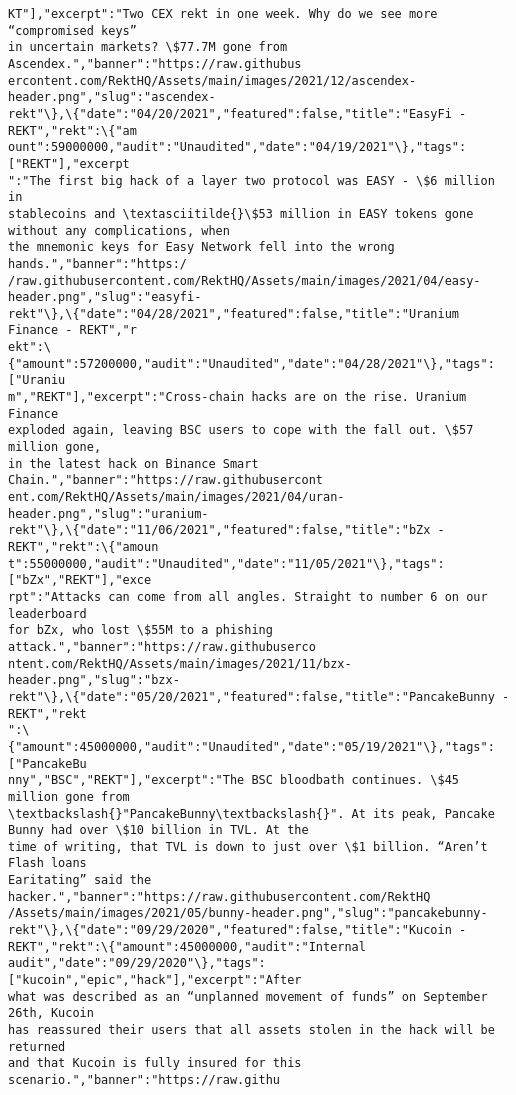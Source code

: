 \documentclass[11pt]{article}
\begin{document}
\begin{Verbatim}[commandchars=\\\{\}]
KT"],"excerpt":"Two CEX rekt in one week. Why do we see more “compromised keys”
in uncertain markets? \$77.7M gone from Ascendex.","banner":"https://raw.githubus
ercontent.com/RektHQ/Assets/main/images/2021/12/ascendex-
header.png","slug":"ascendex-
rekt"\},\{"date":"04/20/2021","featured":false,"title":"EasyFi - REKT","rekt":\{"am
ount":59000000,"audit":"Unaudited","date":"04/19/2021"\},"tags":["REKT"],"excerpt
":"The first big hack of a layer two protocol was EASY - \$6 million in
stablecoins and \textasciitilde{}\$53 million in EASY tokens gone without any complications, when
the mnemonic keys for Easy Network fell into the wrong hands.","banner":"https:/
/raw.githubusercontent.com/RektHQ/Assets/main/images/2021/04/easy-
header.png","slug":"easyfi-
rekt"\},\{"date":"04/28/2021","featured":false,"title":"Uranium Finance - REKT","r
ekt":\{"amount":57200000,"audit":"Unaudited","date":"04/28/2021"\},"tags":["Uraniu
m","REKT"],"excerpt":"Cross-chain hacks are on the rise. Uranium Finance
exploded again, leaving BSC users to cope with the fall out. \$57 million gone,
in the latest hack on Binance Smart Chain.","banner":"https://raw.githubusercont
ent.com/RektHQ/Assets/main/images/2021/04/uran-header.png","slug":"uranium-
rekt"\},\{"date":"11/06/2021","featured":false,"title":"bZx - REKT","rekt":\{"amoun
t":55000000,"audit":"Unaudited","date":"11/05/2021"\},"tags":["bZx","REKT"],"exce
rpt":"Attacks can come from all angles. Straight to number 6 on our leaderboard
for bZx, who lost \$55M to a phishing attack.","banner":"https://raw.githubuserco
ntent.com/RektHQ/Assets/main/images/2021/11/bzx-header.png","slug":"bzx-
rekt"\},\{"date":"05/20/2021","featured":false,"title":"PancakeBunny - REKT","rekt
":\{"amount":45000000,"audit":"Unaudited","date":"05/19/2021"\},"tags":["PancakeBu
nny","BSC","REKT"],"excerpt":"The BSC bloodbath continues. \$45 million gone from
\textbackslash{}"PancakeBunny\textbackslash{}". At its peak, Pancake Bunny had over \$10 billion in TVL. At the
time of writing, that TVL is down to just over \$1 billion. “Aren’t Flash loans
Earitating” said the hacker.","banner":"https://raw.githubusercontent.com/RektHQ
/Assets/main/images/2021/05/bunny-header.png","slug":"pancakebunny-
rekt"\},\{"date":"09/29/2020","featured":false,"title":"Kucoin -
REKT","rekt":\{"amount":45000000,"audit":"Internal
audit","date":"09/29/2020"\},"tags":["kucoin","epic","hack"],"excerpt":"After
what was described as an “unplanned movement of funds” on September 26th, Kucoin
has reassured their users that all assets stolen in the hack will be returned
and that Kucoin is fully insured for this scenario.","banner":"https://raw.githu

\end{Verbatim}
\end{document}

